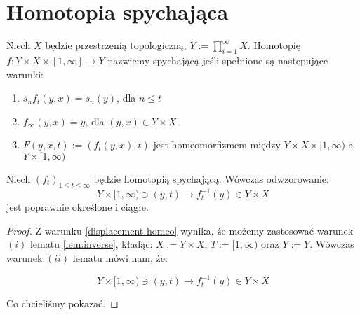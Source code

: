 \section{Homotopia spychająca}
\begin{df}
  Niech $X$ będzie przestrzenią topologiczną, $Y := \prod_{i=1}^\infty X$. Homotopię $f: Y \times X \times [1,\infty] \rightarrow Y$ nazwiemy spychającą jeśli spełnione są następujące warunki:
  \begin{enumerate}
    \item \label{displacement-proj} $s_n f_t(y,x) = s_n(y)$, dla $n \leq t$
    \item \label{displacement-infty} $f_\infty(y,x) = y$, dla $(y,x) \in Y \times X$
    \item \label{displacement-homeo} $F(y,x,t) := (f_t(y,x), t)$ jest homeomorfizmem między $Y \times X \times [1,\infty)$ a $Y \times [1,\infty)$
  \end{enumerate}
\end{df}

\begin{lem}
  Niech $(f_t)_{1 \leq t \leq \infty}$ będzie homotopią spychającą. Wówczas odwzorowanie:
  \[Y \times [1,\infty) \ni (y, t) \rightarrow f_t^{-1}(y) \in Y \times X\]
  jest poprawnie określone i ciągłe.
  
  \begin{proof}
    Z warunku \ref{displacement-homeo} wynika, że możemy zastosować warunek $(i)$ lematu \ref{lem:inverse}, kładąc: $X := Y \times X$, $T := [1, \infty)$ oraz $Y := Y$. Wówczas warunek $(ii)$ lematu mówi nam, że:
    
    \[Y \times [1,\infty) \ni (y, t) \rightarrow f_t^{-1}(y) \in Y \times X\]
    
    Co chcieliśmy pokazać.
  \end{proof}
\end{lem}

